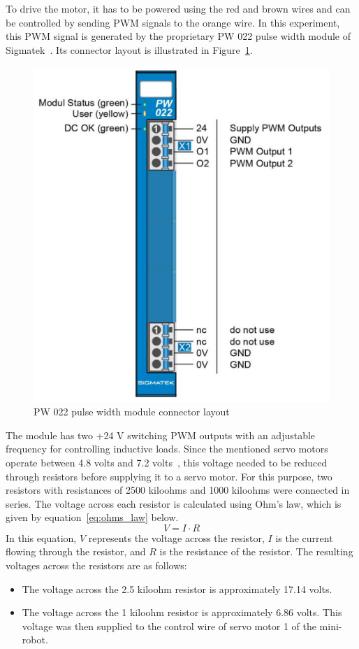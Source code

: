\documentclass[MMR,Master,english]{twbook}
\begin{document}
\noindent To drive the motor, it has to be powered using the red and brown wires and can be controlled by sending PWM signals to the orange wire. In this experiment, this PWM signal is generated by the proprietary PW 022 pulse width module of Sigmatek~\cite{DigitalOutputSIGMATEK}. Its connector layout is illustrated in Figure~\ref{fig:pw022_connectors}.

\begin{figure}[H]
	\centering
	\includegraphics[width=0.5\columnwidth]{img/experiment/pw022_connectors.png}
	\caption[PW 022 pulse width module connector layout]{PW 022 pulse width module connector layout~\cite{DigitalOutputSIGMATEK}}
	\label{fig:pw022_connectors}
\end{figure}

\noindent The module has two +24 V switching PWM outputs with an adjustable frequency for controlling inductive loads. Since the mentioned servo motors operate between 4.8 volts and 7.2 volts~\cite{MG996RServoMotor}, this voltage needed to be reduced through resistors before supplying it to a servo motor. For this purpose, two resistors with resistances of 2500 kiloohms and 1000 kiloohms were connected in series. The voltage across each resistor is calculated using Ohm's law, which is given by equation~\ref{eq:ohms_law} below.
\begin{equation}
	\label{eq:ohms_law}
	V = I \cdot R
\end{equation}
In this equation, \(V\) represents the voltage across the resistor, \(I\) is the current flowing through the resistor, and \(R\) is the resistance of the resistor. The resulting voltages across the resistors are as follows:
\begin{itemize}
	\item The voltage across the 2.5 kiloohm resistor is approximately 17.14 volts.
	\item The voltage across the 1 kiloohm resistor is approximately 6.86 volts. This voltage was then supplied to the control wire of servo motor 1 of the mini-robot.
\end{itemize}
\end{document}

